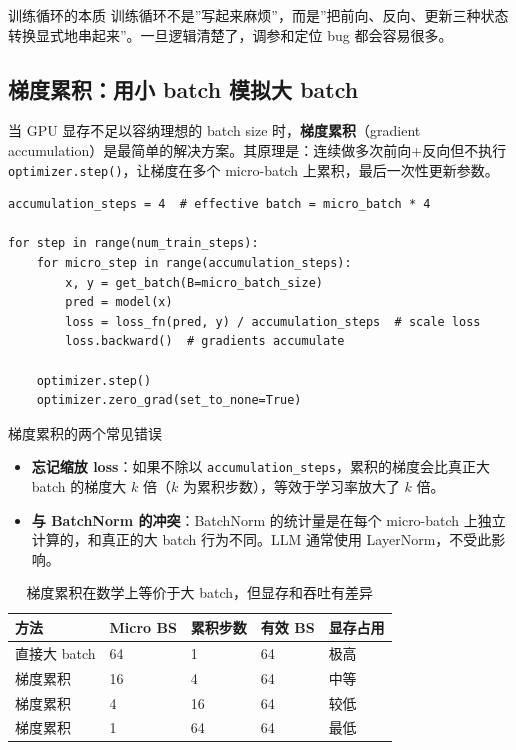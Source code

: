 \documentclass[a4paper]{article}
\begin{document}
\begin{importantbox}{训练循环的本质}
训练循环不是”写起来麻烦”，而是”把前向、反向、更新三种状态转换显式地串起来”。一旦逻辑清楚了，调参和定位 bug 都会容易很多。
\end{importantbox}

\subsection{梯度累积：用小 batch 模拟大 batch}

当 GPU 显存不足以容纳理想的 batch size 时，\textbf{梯度累积}（gradient accumulation）是最简单的解决方案。其原理是：连续做多次前向+反向但不执行 \texttt{optimizer.step()}，让梯度在多个 micro-batch 上累积，最后一次性更新参数。

\begin{lstlisting}[caption={梯度累积的标准实现}]
accumulation_steps = 4  # effective batch = micro_batch * 4

for step in range(num_train_steps):
    for micro_step in range(accumulation_steps):
        x, y = get_batch(B=micro_batch_size)
        pred = model(x)
        loss = loss_fn(pred, y) / accumulation_steps  # scale loss
        loss.backward()  # gradients accumulate

    optimizer.step()
    optimizer.zero_grad(set_to_none=True)
\end{lstlisting}

\begin{warningbox}{梯度累积的两个常见错误}
\begin{itemize}
    \item \textbf{忘记缩放 loss}：如果不除以 \texttt{accumulation\_steps}，累积的梯度会比真正大 batch 的梯度大 $k$ 倍（$k$ 为累积步数），等效于学习率放大了 $k$ 倍。
    \item \textbf{与 BatchNorm 的冲突}：BatchNorm 的统计量是在每个 micro-batch 上独立计算的，和真正的大 batch 行为不同。LLM 通常使用 LayerNorm，不受此影响。
\end{itemize}
\end{warningbox}

\begin{table}[H]
\centering
\begin{tabular}{p{}p{}p{}p{}p{}}
\toprule
\textbf{方法} & \textbf{Micro BS} & \textbf{累积步数} & \textbf{有效 BS} & \textbf{显存占用} \\
\midrule
直接大 batch & 64 & 1 & 64 & 极高 \\
梯度累积 & 16 & 4 & 64 & 中等 \\
梯度累积 & 4 & 16 & 64 & 较低 \\
梯度累积 & 1 & 64 & 64 & 最低 \\
\bottomrule
\end{tabular}
\caption{梯度累积在数学上等价于大 batch，但显存和吞吐有差异}
\end{table}
\end{document}
